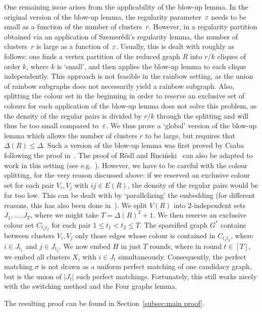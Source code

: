 \documentclass[10pt]{amsart}
\theoremstyle{definition}
\theoremstyle{claimstyle}
\theoremstyle{stepstyle}
\numberwithin{equation}{section}
\begin{document}
One remaining issue arises from the applicability of the blow-up lemma. In the original version of the blow-up lemma, the regularity parameter~${\varepsilon}$ needs to be small as a function of the number of clusters~$r$. However, in a regularity partition obtained via an application of Szemer\'edi's regularity lemma, the number of clusters~$r$ is large as a function of~${\varepsilon}$. Usually, this is dealt with roughly as follows: one finds a vertex partition of the reduced graph $R$ into $r/k$ cliques of order $k$, where $k$ is `small', and then applies the blow-up lemma to each clique independently. 
This approach is not feasible in the rainbow setting, as the union of rainbow subgraphs does not necessarily yield a rainbow subgraph.
Also, splitting the colour set in the beginning in order to reserve an exclusive set of colours for each application of the blow-up lemma does not solve this problem, as the density of the regular pairs is divided by $r/k$ through the splitting and will thus be too small compared to~${\varepsilon}$. We thus prove a `global' version of the blow-up lemma which allows the number of clusters $r$ to be large, but requires that $\Delta(R)\le \Delta$.
Such a version of the blow-up lemma was first proved by Csaba~\cite{csaba:07} following the proof in~\cite{KSS:97}.
The proof of R\"odl and Ruci\'nski~\cite{RR:99} can also be adapted to work in this setting (see e.g.~\cite{KKOT:ta}).
However, we have to be careful with the colour splitting, for the very reason discussed above:
if we reserved an exclusive colour set for each pair $V_i,V_j$ with $ij\in E(R)$,
the density of the regular pairs would be far too low.
This can be dealt with by `parallelizing' the embedding (for different reasons, this has also been done in~\cite{KKOT:ta}).
We split $V(R)$ into $2$-independent sets $J_1,\dots,J_T$, where we might take $T=\Delta(R)^2+1$.
We then reserve an exclusive colour set $C_{t_1t_2}$ for each pair $1\le t_1<t_2\le T$.
The sparsified graph $G^\ast$ contains between clusters $V_i,V_j$ only those edges whose colour is contained in $C_{t_1t_2}$, where $i\in J_{t_1}$ and $j\in J_{t_2}$.
We now embed $H$ in just $T$ rounds, where in round $t\in [T]$, we embed all clusters $X_i$ with $i\in J_t$ simultaneously. Consequently, the perfect matching $\sigma$ is not drawn as a uniform perfect matching of one candidacy graph, but is the union of $|J_t|$ such perfect matchings. Fortunately, this still works nicely with the switching method and the Four graphs lemma.


The resulting proof can be found in Section~\ref{subsec:main proof}.
\end{document}
